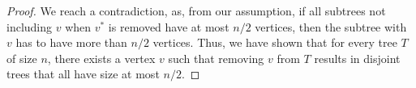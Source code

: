 \documentclass[11pt]{scrartcl}
\theoremstyle{dotlessP}
\theoremstyle{dotlessN}
\newcommand{\contradiction}{{\hbox{%
    \setbox0=\hbox{$\mkern-3mu\times\mkern-3mu$}%
    \setbox1=\hbox to0pt{\hss$\times$\hss}%
    \copy0\raisebox{0.5\wd0}{\copy1}\raisebox{-0.5\wd0}{\box1}\box0
}}}
\begin{document}
\begin{ans}
\begin{proof}
		We reach a contradiction, as, from our assumption, if all subtrees not including $v$ when $v^*$ is removed have at most $n/2$ vertices, then the subtree with $v$ has to have more than $n/2$ vertices. Thus, we have shown that for every tree $T$ of size $n$, there exists a vertex $v$ such that removing $v$ from $T$ results in disjoint trees that all have size at most $n/2$.
%
%
%
%
%
	\end{proof}
\end{ans}
\begin{ans}
	
\end{ans}
\end{document}

